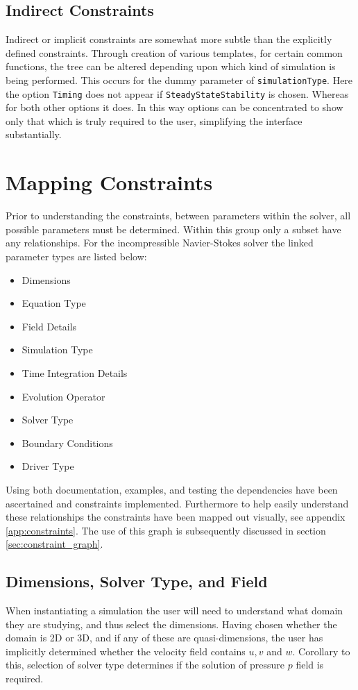 \documentclass[11pt, a4paper]{report}
\begin{document}
\subsection{Indirect Constraints}
Indirect or implicit constraints are somewhat more subtle than the explicitly defined constraints. Through creation of various templates, for certain common functions, the tree can be altered depending upon which kind of simulation is being performed. This occurs for the dummy parameter of \texttt{simulationType}. Here the option \texttt{Timing} does not appear if \texttt{SteadyStateStability} is chosen. Whereas for both other options it does. In this way options can be concentrated to show only that which is truly required to the user, simplifying the interface substantially.

\section{Mapping Constraints}
Prior to understanding the constraints, between parameters within the solver, all possible parameters must be determined. Within this group only a subset have any relationships. For the incompressible Navier-Stokes solver the linked parameter types are listed below:
\begin{multicols}{3}
\begin{itemize}
\item Dimensions 
\item Equation Type
\item Field Details
\item Simulation Type
\item Time Integration Details
\item Evolution Operator
\item Solver Type
\item Boundary Conditions
\item Driver Type
\end{itemize}
\end{multicols}
Using both documentation, examples, and testing the dependencies have been ascertained and constraints implemented. Furthermore to help easily understand these relationships the constraints have been mapped out visually, see appendix \ref{app:constraints}. The use of this graph is subsequently discussed in section \ref{sec:constraint_graph}.

\subsection{Dimensions, Solver Type, and Field}
When instantiating a simulation the user will need to understand what domain they are studying, and thus select the dimensions. Having chosen whether the domain is 2D or 3D, and if any of these are quasi-dimensions, the user has implicitly determined whether the velocity field contains $u, v$ and $w$. Corollary to this, selection of solver type determines if the solution of pressure $p$ field is required.
\end{document}
